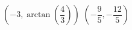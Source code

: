 { $\left( -3, \arctan\left(\dfrac{4}{3}\right) \right)$ }
{ $\left( -\dfrac{9}{5}, -\dfrac{12}{5} \right)$}
